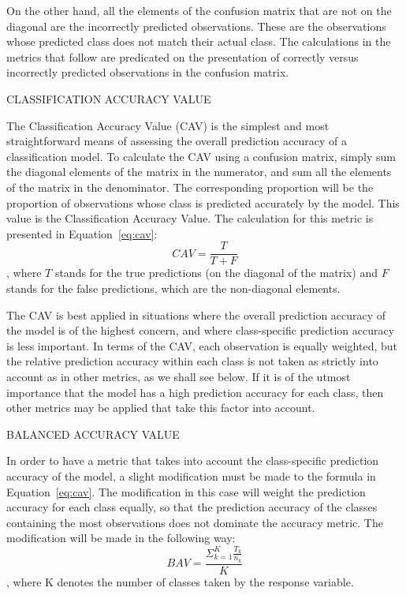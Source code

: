 \documentclass[12pt]{article}
\begin{document}
On the other hand, all the elements of the confusion matrix that are not on the 
diagonal are the incorrectly predicted observations.  These are the observations 
whose predicted class does not match their actual class.  The calculations in 
the metrics that follow are predicated on the presentation of correctly versus 
incorrectly predicted observations in the confusion matrix.  

CLASSIFICATION ACCURACY VALUE

The Classification Accuracy Value (CAV) is the simplest and most straightforward 
means of assessing the overall prediction accuracy of a classification model.  To 
calculate the CAV using a confusion matrix, simply sum the diagonal elements of 
the matrix in the numerator, and sum all the elements of the matrix in the 
denominator.  The corresponding proportion will be the proportion of observations 
whose class is predicted accurately by the model.  This value is the Classification 
Accuracy Value.  The calculation for this metric is presented in 
Equation~\eqref{eq:cav}:
\begin{equation}
    \label{eq:cav}
    CAV = \frac {T} {T + F}
\end{equation}
, where $T$ stands for the true predictions (on the diagonal of the matrix) and $F$ 
stands for the false predictions, which are the non-diagonal elements.  

The CAV is best applied in situations where the overall prediction accuracy of the 
model is of the highest concern, and where class-specific prediction accuracy is less 
important.  In terms of the CAV, each observation is equally weighted, but the 
relative prediction accuracy within each class is not taken as strictly into account 
as in other metrics, as we shall see below.  If it is of the utmost importance that 
the model has a high prediction accuracy for each class, then other metrics may be 
applied that take this factor into account.

BALANCED ACCURACY VALUE

In order to have a metric that takes into account the class-specific prediction 
accuracy of the model, a slight modification must be made to the formula in 
Equation~\eqref{eq:cav}.  The modification in this case will weight the prediction 
accuracy for each class equally, so that the prediction accuracy of the classes 
containing the most observations does not dominate the accuracy metric.  The 
modification will be made in the following way:
\begin{equation}
    \label{eq:bav}
    BAV = \frac {\Sigma_ {k=1} ^ {K} \frac {T_k} {n_k}} {K}
\end{equation}
, where K denotes the number of classes taken by the response variable.  
\end{document}
